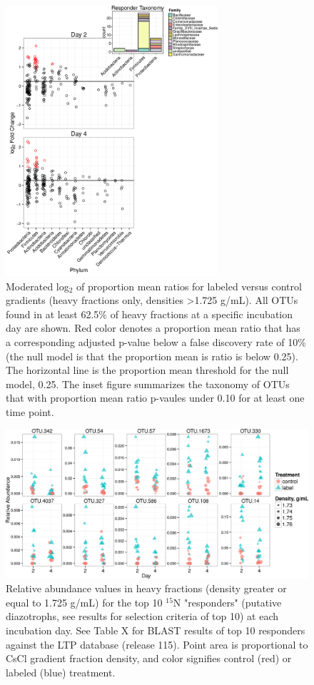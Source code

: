 \begin{figure}[h!]
  \centering
    \includegraphics[width=0.7\textwidth]{figures/l2fc1/l2fc_stacked_w_inset.png}
  \caption{Moderated log$_{2}$ of proportion mean ratios for labeled versus control gradients (heavy fractions only, densities >1.725 g/mL). All OTUs found in at least 62.5\% of heavy fractions at a specific incubation day are shown. Red color denotes a proportion mean ratio that has a corresponding adjusted p-value below a false discovery rate of 10\% (the null model is that the proportion mean is ratio is below 0.25). The horizontal line is the proportion mean threshold for the null model, 0.25. The inset figure summarizes the taxonomy of OTUs that with proportion mean ratio p-vaules under 0.10 for at least one time point.}
  \label{fig:l2fc}
\end{figure}

\begin{figure}[h!]
  \centering
    \includegraphics[width=1.0\textwidth]{figures/scatter_heavy_topN2/scatter_heavy_topN.png}
  \caption{Relative abundance values in heavy fractions (density greater or equal to 1.725 g/mL) for the top 10 $^{15}$N "responders" (putative diazotrophs, see results for selection criteria of top 10) at each incubation day. See Table X for BLAST results of top 10 responders against the LTP database (release 115). Point area is proportional to CsCl gradient fraction density, and color signifies control (red) or labeled (blue) treatment.}
  \label{fig:scatter_heavy}
\end{figure}


